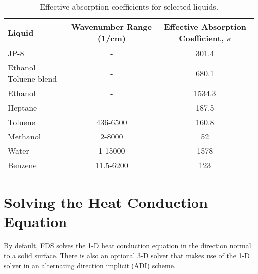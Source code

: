 \begin{table}[ht]
\caption[Effective absorption coefficients for selected liquids]{Effective absorption coefficients for selected liquids.}
\centering
\begin{tabular}{l c c}
\hline\hline
Liquid                                              & Wavenumber Range (\si{1/\cm})  & Effective Absorption Coefficient, $\kappa$    \\ \hline
JP-8 \cite{Suo-Anttila:PCT2009}                     &  -                             & 301.4                                         \\
Ethanol-Toluene blend \cite{Suo-Anttila:PCT2009}    &  -                             & 680.1                                         \\
Ethanol \cite{Suo-Anttila:PCT2009}                  &  -                             & 1534.3                                        \\
Heptane \cite{Suo-Anttila:PCT2009}                  &  -                             & 187.5                                         \\
Toluene \cite{Bertie:AS1994a}                       &  436-6500                      & 160.8                                         \\
Methanol\cite{Bertie:AS1993a}                       &  2-8000                        & 52                                            \\
Water   \cite{Bertie:AS1996}                        &  1-15000                       & 1578                                          \\
Benzene \cite{Bertie:AS1993b}                       &  11.5-6200                     & 123                                           \\ \hline
\end{tabular}
\label{tbl_abscoeff}
\end{table}




\chapter{Solving the Heat Conduction Equation}
\label{solid-phase-discretization}

By default, FDS solves the 1-D heat conduction equation in the direction normal to a solid surface. There is also an optional 3-D solver that makes use of the 1-D solver in an alternating direction implicit (ADI) scheme.


